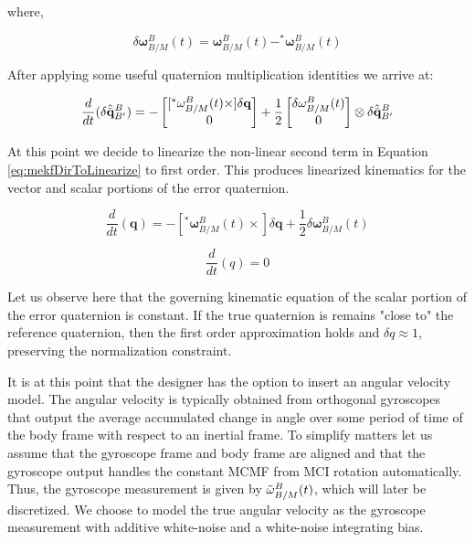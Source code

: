\documentclass[conf]{new-aiaa}
\newcommand{\vect}[1]{\mathbf{#1}}
\newcommand{\qUnitGeneric}{\hat{\Bar{\mathbf{q}}}}
\newcommand{\errQuat}{\delta\qUnitGeneric^{B}_{B'}}
\newcommand{\errwBM}{\delta\vect{\omega}^B_{B/M}}
\newcommand{\wBMMeas}{\Tilde{\vect{\omega}}^B_{B/M}}
\newcommand{\wBM}{\vect{\omega}^B_{B/M}}
\begin{document}
where,

\begin{equation}
    \errwBM(t) = \wBM(t) - ^*\wBM(t)
    \label{eq:mekfDir_errOmega}
\end{equation}


After applying some useful quaternion multiplication identities we arrive at:


\begin{equation}
 \frac{d}{dt}({\errQuat}) =
 -
 \begin{bmatrix}
     [^*\wBM(t) \times]\delta\vect{q} \\ 0
 \end{bmatrix}
 +
 \frac{1}{2}
 \begin{bmatrix}
     \errwBM(t) \\ 0
 \end{bmatrix}
 \otimes
 \errQuat
\label{eq:mekfDirToLinearize}
\end{equation}


At this point we decide to linearize the non-linear second term in Equation \ref{eq:mekfDirToLinearize} to first order. This produces linearized kinematics for the vector and scalar portions of the error quaternion.

\begin{equation}
 \frac{d}{dt}({\vect{q}}) =
 -
 [^*\wBM(t) \times]\delta\vect{q} + \frac{1}{2}\errwBM(t)
\label{eq:mekfVecKin}
\end{equation}

\begin{equation}
 \frac{d}{dt}({q}) = 0
\label{eq:mekfScalarKin}
\end{equation}


Let us observe here that the governing kinematic equation of the scalar portion of the error quaternion is constant. If the true quaternion is remains "close to" the reference quaternion, then the first order approximation holds and $\delta q \approx 1$, preserving the normalization constraint.



It is at this point that the designer has the option to insert an angular velocity model. The angular velocity is typically obtained from orthogonal gyroscopes that output the average accumulated change in angle over some period of time of the body frame with respect to an inertial frame. To simplify matters let us assume that the gyroscope frame and body frame are aligned and that the gyroscope output handles the constant MCMF from MCI rotation automatically. Thus, the gyroscope measurement is given by $\wBMMeas(t)$, which will later be discretized.
We choose to model the true angular velocity as the gyroscope measurement with additive white-noise and a white-noise integrating bias.
\end{document}
